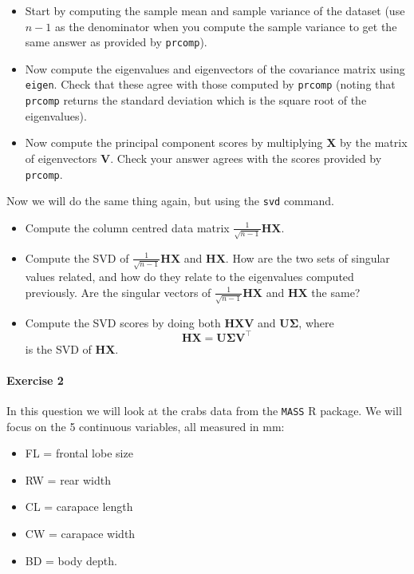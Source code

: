 \documentclass[]{book}
\providecommand{\tightlist}{%
  \setlength{\itemsep}{0pt}\setlength{\parskip}{0pt}}
\let\oldparagraph\paragraph
\renewcommand{\paragraph}[1]{\oldparagraph{#1}\mbox{}}
\theoremstyle{definition}
\theoremstyle{definition}
\theoremstyle{definition}
\theoremstyle{remark}
\begin{document}
\begin{itemize}
\tightlist
\item
  Start by computing the sample mean and sample variance of the dataset (use \(n-1\) as the denominator when you compute the sample variance to get the same answer as provided by \texttt{prcomp}).
\item
  Now compute the eigenvalues and eigenvectors of the covariance matrix using \texttt{eigen}. Check that these agree with those computed by \texttt{prcomp} (noting that \texttt{prcomp} returns the standard deviation which is the square root of the eigenvalues).
\item
  Now compute the principal component scores by multiplying \(\mathbf X\) by the matrix of eigenvectors \(\mathbf V\). Check your answer agrees with the scores provided by \texttt{prcomp}.
\end{itemize}

Now we will do the same thing again, but using the \texttt{svd} command.

\begin{itemize}
\item
  Compute the column centred data matrix \(\frac{1}{\sqrt{n-1}}\mathbf H\mathbf X\).
\item
  Compute the SVD of \(\frac{1}{\sqrt{n-1}}\mathbf H\mathbf X\) and \(\mathbf H\mathbf X\). How are the two sets of singular values related, and how do they relate to the eigenvalues computed previously.
  Are the singular vectors of \(\frac{1}{\sqrt{n-1}}\mathbf H\mathbf X\) and \(\mathbf H\mathbf X\) the same?
\item
  Compute the SVD scores by doing both \(\mathbf H\mathbf X\mathbf V\) and \(\mathbf U\boldsymbol{\Sigma}\), where
  \[\mathbf H\mathbf X= \mathbf U\boldsymbol{\Sigma}\mathbf V^\top\]
  is the SVD of \(\mathbf H\mathbf X\).
\end{itemize}

\hypertarget{exercise-2}{%
\paragraph{Exercise 2}\label{exercise-2}}

In this question we will look at the crabs data from the \texttt{MASS} R package.
We will focus on the 5 continuous variables, all measured in mm:

\begin{itemize}
\tightlist
\item
  FL = frontal lobe size
\item
  RW = rear width
\item
  CL = carapace length
\item
  CW = carapace width
\item
  BD = body depth.
\end{itemize}
\end{document}
